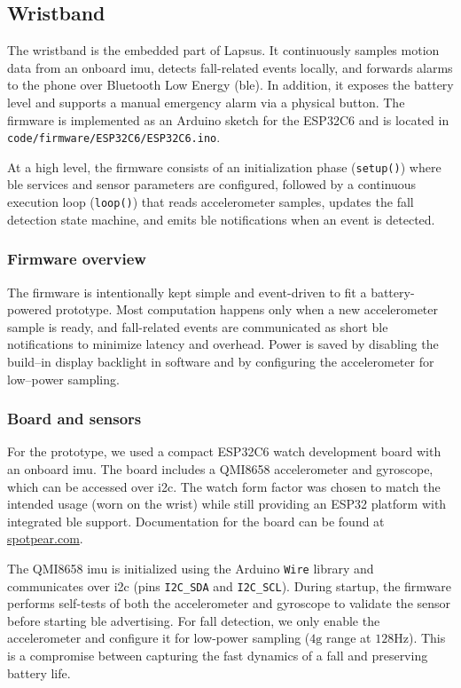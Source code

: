 \subsection{Wristband}
The wristband is the embedded part of Lapsus. It continuously samples motion data from an onboard \gls{imu}, detects fall-related events locally, and forwards alarms to the phone over Bluetooth Low Energy (\gls{ble}). In addition, it exposes the battery level and supports a manual emergency alarm via a physical button. The firmware is implemented as an Arduino sketch for the ESP32C6 and is located in \verb|code/firmware/ESP32C6/ESP32C6.ino|.

At a high level, the firmware consists of an initialization phase (\verb|setup()|) where \gls{ble} services and sensor parameters are configured, followed by a continuous execution loop (\verb|loop()|) that reads accelerometer samples, updates the fall detection state machine, and emits \gls{ble} notifications when an event is detected.

\subsubsection{Firmware overview}
The firmware is intentionally kept simple and event-driven to fit a battery-powered prototype. Most computation happens only when a new accelerometer sample is ready, and fall-related events are communicated as short \gls{ble} notifications to minimize latency and overhead. Power is saved by disabling the build--in display backlight in software and by configuring the accelerometer for low--power sampling.

\subsubsection{Board and sensors}
For the prototype, we used a compact ESP32C6 watch development board with an onboard \gls{imu}. The board includes a QMI8658 accelerometer and gyroscope, which can be accessed over \gls{i2c}. The watch form factor was chosen to match the intended usage (worn on the wrist) while still providing an ESP32 platform with integrated \gls{ble} support. Documentation for the board can be found at \href{https://spotpear.com/wiki/ESP32-C6-1.69-inch-LCD-Display-TouchScreen-AI-Programmable-DeepSeek-Watch.html#Demo}{spotpear.com}.

The QMI8658 \gls{imu} is initialized using the Arduino \verb|Wire| library and communicates over \gls{i2c} (pins \verb|I2C_SDA| and \verb|I2C_SCL|). During startup, the firmware performs self-tests of both the accelerometer and gyroscope to validate the sensor before starting \gls{ble} advertising. For fall detection, we only enable the accelerometer and configure it for low-power sampling ($4\mathrm{g}$ range at $128\mathrm{Hz}$). This is a compromise between capturing the fast dynamics of a fall and preserving battery life.

